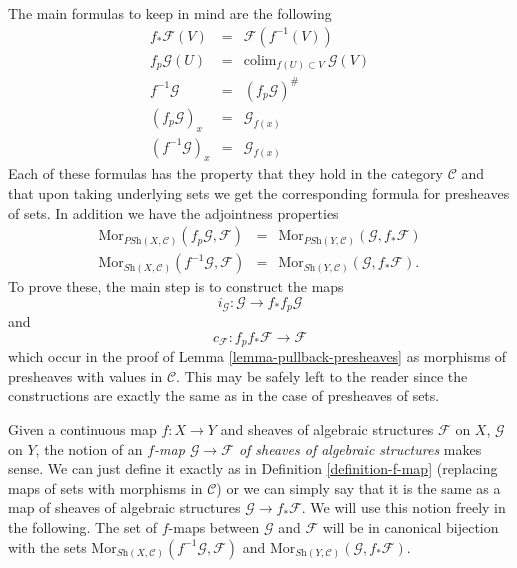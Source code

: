 \medskip\noindent
The main formulas to keep in mind are the following
\begin{eqnarray*}
f_*\mathcal{F}(V) & = & \mathcal{F}(f^{-1}(V)) \\
f_p\mathcal{G}(U) & = & \text{colim}_{f(U) \subset V}\ \mathcal{G}(V) \\
f^{-1}\mathcal{G} & = & (f_p\mathcal{G})^\# \\
(f_p\mathcal{G})_x & = & \mathcal{G}_{f(x)} \\
(f^{-1}\mathcal{G})_x & = & \mathcal{G}_{f(x)}
\end{eqnarray*}
Each of these formulas has the property that they hold in the
category $\mathcal{C}$ and that upon taking underlying
sets we get the corresponding formula for presheaves of sets.
In addition we have the adjointness properties
\begin{eqnarray*}
\text{Mor}_{\textit{PSh}(X, \mathcal{C})}(f_p\mathcal{G}, \mathcal{F})
& = &
\text{Mor}_{\textit{PSh}(Y, \mathcal{C})}(\mathcal{G}, f_*\mathcal{F}) \\
\text{Mor}_{\textit{Sh}(X, \mathcal{C})}(f^{-1}\mathcal{G}, \mathcal{F})
& = &
\text{Mor}_{\textit{Sh}(Y, \mathcal{C})}(\mathcal{G}, f_*\mathcal{F}).
\end{eqnarray*}
To prove these, the main step is to construct the maps
$$
i_\mathcal{G} : \mathcal{G} \longrightarrow f_*f_p\mathcal{G}
$$
and
$$
c_{\mathcal{F}} : f_p f_* \mathcal{F} \longrightarrow \mathcal{F}
$$
which occur in the proof of Lemma \ref{lemma-pullback-presheaves} as
morphisms of presheaves with values in $\mathcal{C}$. This may be safely
left to the reader since the constructions are exactly the same
as in the case of presheaves of sets.

\medskip\noindent
Given a continuous map $f : X \to Y$ and sheaves of algebraic
structures $\mathcal{F}$ on $X$, $\mathcal{G}$ on $Y$, the notion
of an {\it $f$-map $\mathcal{G} \to \mathcal{F}$
of sheaves of algebraic structures} makes sense. We can just define
it exactly as in Definition \ref{definition-f-map} (replacing maps
of sets with morphisms in $\mathcal{C}$) or we can
simply say that it is the same as a map of sheaves of algebraic
structures $\mathcal{G} \to f_*\mathcal{F}$. We will use this
notion freely in the following. The set of $f$-maps between
$\mathcal{G}$ and $\mathcal{F}$ will be in canonical bijection
with the sets
$\text{Mor}_{\textit{Sh}(X, \mathcal{C})}(f^{-1}\mathcal{G}, \mathcal{F})$
and 
$\text{Mor}_{\textit{Sh}(Y, \mathcal{C})}(\mathcal{G}, f_*\mathcal{F})$.

